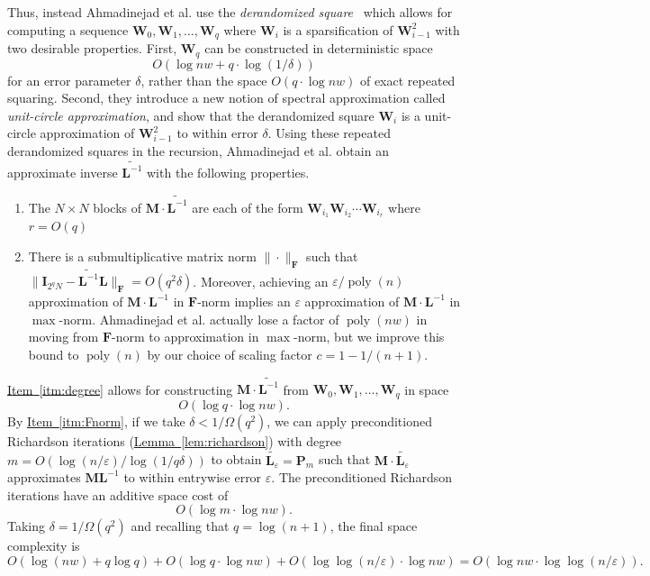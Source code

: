 \documentclass[11pt]{article}
\numberwithin{equation}{section}
\theoremstyle{definition}
\theoremstyle{plain}
\newcommand{\expref}[2]{\hyperref[#2]{#1~\ref{#2}}}
\newcommand{\eps}{\varepsilon}
\newcommand{\mM}{\mathbf{M}}
\newcommand{\mF}{\mathbf{F}}
\newcommand{\mW}{\mathbf{W}}
\newcommand{\mL}{\mathbf{L}}
\newcommand{\I}{\mathbf{I}}
\newcommand{\Pm}{\mathbf{P}_m}
\newcommand{\poly}{\operatorname{poly}}
\newcommand{\Lt}{\widetilde{\mathbf{L}^{-1}}}
\newcommand{\Lte}{\widetilde{\mathbf{L}_{\eps}}}
\begin{document}
    Thus, instead %
Ahmadinejad  %
et al. use the \emph{derandomized square}~\cite{RozenmanVa05} which allows for computing a sequence
    $\mW_0,\mW_1,\ldots,\mW_q$ where $\mW_i$ is a sparsification of $\mW^2_{i-1}$ with two desirable properties. First, $\mW_q$ can be constructed in
    deterministic space $$O(\log nw+q\cdot \log(1/\delta))$$ for an error parameter $\delta$, rather than the space $O(q\cdot \log nw)$ of exact repeated squaring.  Second, they introduce a new notion of spectral approximation called \emph{unit-circle approximation}, and show that
    the derandomized square
    $\mW_i$ is a unit-circle approximation of $\mW_{i-1}^2$ to within 
    error $\delta$.
    Using these repeated derandomized squares in the recursion, 
%
Ahmadinejad  %
et al. obtain an approximate inverse $\Lt$ with the
%
following properties.  %
    \begin{enumerate}
        \item The $N\times N$ blocks of $\mM\cdot \Lt$ are 
        each of the form $\mW_{i_1}\mW_{i_2}\cdots \mW_{i_r}$
        where $r=O(q)$ \label{itm:degree}
        \item There is a submultiplicative matrix norm $\|\cdot \|_\mF$ such that
        $\|\I_{2^qN}-\Lt \mL\|_\mF = O(q^2\delta)$. Moreover, achieving an $\eps/\poly(n)$ approximation of $\mM\cdot \mL^{-1}$ in $\mF$-norm implies an $\eps$ approximation of $\mM\cdot \mL^{-1}$ in $\max$-norm.   %
Ahmadinejad  %
et al. actually lose a factor of $\poly(nw)$ in moving from $\mF$-norm to approximation in $\max$-norm, but we improve this bound to $\poly(n)$ by our choice of scaling factor $c=1-1/(n+1)$.   
        \label{itm:Fnorm} 
    \end{enumerate}

    
    \expref{Item}{itm:degree} allows for constructing $\mM\cdot \Lt$ from
    $\mW_0,\mW_1,\ldots,\mW_q$
    in space
    $$O(\log q \cdot \log nw).$$
    By \expref{Item}{itm:Fnorm}, if we take $\delta<1/\Omega(q^2)$, we 
    can apply 
    preconditioned Richardson iterations (\expref{Lemma}{lem:richardson})
    with degree $m=O(\log(n/\eps)/\log(1/q\delta))$ to obtain $\Lte=\Pm$ 
    such that $\mM\cdot \Lte$ approximates $\mM\mL^{-1}$ to within entrywise error $\eps.$
    The preconditioned Richardson iterations have an additive
    space cost of %
    $$O(\log m\cdot \log nw).$$
    Taking $\delta=1/\Omega(q^2)$ and recalling that $q=\log(n+1)$, the final space complexity is
    $$O(\log(nw)+q\log q) + O(\log q\cdot \log nw)+O(\log\log (n/\eps)\cdot \log nw) = O(\log nw \cdot \log\log(n/\eps)).$$
    
\end{document}
